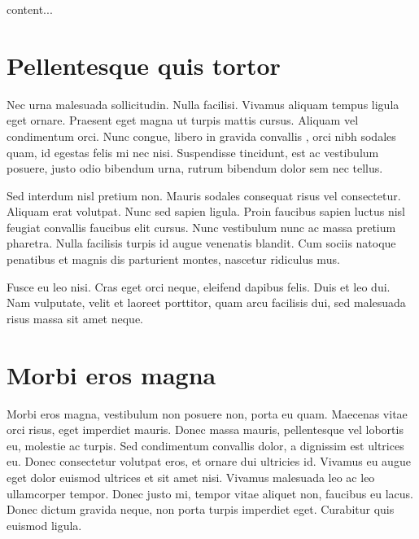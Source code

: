\documentclass[a4paper,UKenglish,cleveref, autoref, thm-restate]{lipics-v2021}
\begin{document}
\begin{remark}
content...
\end{remark}

\section{Pellentesque quis tortor}

Nec urna malesuada sollicitudin. Nulla facilisi. Vivamus aliquam tempus ligula eget ornare. Praesent eget magna ut turpis mattis cursus. Aliquam vel condimentum orci. Nunc congue, libero in gravida convallis \cite{DBLP:conf/focs/HopcroftPV75}, orci nibh sodales quam, id egestas felis mi nec nisi. Suspendisse tincidunt, est ac vestibulum posuere, justo odio bibendum urna, rutrum bibendum dolor sem nec tellus. 

\begin{lemma} 
Sed interdum nisl pretium non. Mauris sodales consequat risus vel consectetur. Aliquam erat volutpat. Nunc sed sapien ligula. Proin faucibus sapien luctus nisl feugiat convallis faucibus elit cursus. Nunc vestibulum nunc ac massa pretium pharetra. Nulla facilisis turpis id augue venenatis blandit. Cum sociis natoque penatibus et magnis dis parturient montes, nascetur ridiculus mus.
\end{lemma}

Fusce eu leo nisi. Cras eget orci neque, eleifend dapibus felis. Duis et leo dui. Nam vulputate, velit et laoreet porttitor, quam arcu facilisis dui, sed malesuada risus massa sit amet neque.

\section{Morbi eros magna}

Morbi eros magna, vestibulum non posuere non, porta eu quam. Maecenas vitae orci risus, eget imperdiet mauris. Donec massa mauris, pellentesque vel lobortis eu, molestie ac turpis. Sed condimentum convallis dolor, a dignissim est ultrices eu. Donec consectetur volutpat eros, et ornare dui ultricies id. Vivamus eu augue eget dolor euismod ultrices et sit amet nisi. Vivamus malesuada leo ac leo ullamcorper tempor. Donec justo mi, tempor vitae aliquet non, faucibus eu lacus. Donec dictum gravida neque, non porta turpis imperdiet eget. Curabitur quis euismod ligula. 



\end{document}
